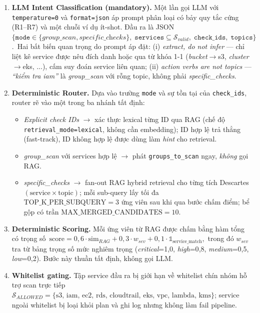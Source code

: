 \begin{enumerate}
  \item \textbf{LLM Intent Classification (mandatory).} Một lần gọi LLM với \texttt{temperature=0} và \texttt{format=json} áp prompt phân loại có bảy quy tắc cứng (R1--R7) và một chuỗi ví dụ ít-shot. Đầu ra là JSON\
    $\{\texttt{mode} \in \{\textit{group\_scan}, \textit{specific\_checks}\},\;
       \texttt{services} \subseteq \mathcal{S}_{valid},\;
       \texttt{check\_ids},\;
       \texttt{topics}\}$.\
    Hai bất biến quan trọng do prompt áp đặt: (i) \textit{extract, do not infer} --- chỉ liệt kê service được nêu đích danh hoặc qua từ khóa 1-1 (\textit{bucket}$\to$s3, \textit{cluster}$\to$eks, ...), cấm suy đoán service liên quan; (ii) \textit{action verbs are not topics} --- \textit{``kiểm tra iam''} là \textit{group\_scan} với rỗng topic, không phải \textit{specific\_checks}.
  \item \textbf{Deterministic Router.} Dựa vào trường \texttt{mode} và sự tồn tại của \texttt{check\_ids}, router rẽ vào một trong ba nhánh tất định:
    \begin{itemize}
      \item \textit{Explicit check IDs} $\to$ xác thực lexical từng ID qua RAG (chế độ \texttt{retrieval\_mode=lexical}, không cần embedding); ID hợp lệ trả thẳng (fast-track), ID không hợp lệ được dùng làm \textit{hint} cho retrieval.
      \item \textit{group\_scan} với services hợp lệ $\to$ phát \texttt{groups\_to\_scan} ngay, \textit{không} gọi RAG.
      \item \textit{specific\_checks} $\to$ fan-out RAG hybrid retrieval cho từng tích Descartes $(\text{service} \times \text{topic})$; mỗi sub-query lấy tối đa $\text{TOP\_K\_PER\_SUBQUERY}=3$ ứng viên sau khi qua bước chấm điểm; bể gộp có trần $\text{MAX\_MERGED\_CANDIDATES}=10$.
    \end{itemize}
  \item \textbf{Deterministic Scoring.} Mỗi ứng viên từ RAG được chấm bằng hàm tổng có trọng số\
    $\text{score} = 0{,}6 \cdot \text{sim}_{RAG} + 0{,}3 \cdot w_{sev} + 0{,}1 \cdot \mathbb{1}_{\text{service\_match}}$,\
    trong đó $w_{sev}$ tra từ bảng trọng số mức nghiêm trọng (\textit{critical}=1{,}0, \textit{high}=0{,}8, \textit{medium}=0{,}5, \textit{low}=0{,}2). Bước này thuần tất định, không gọi LLM.
  \item \textbf{Whitelist gating.} Tập service đầu ra bị giới hạn về whitelist chín nhóm hỗ trợ scan trực tiếp $\mathcal{S}_{ALLOWED} = \{\text{s3, iam, ec2, rds, cloudtrail, eks, vpc, lambda, kms}\}$; service ngoài whitelist bị loại khỏi plan và ghi log nhưng không làm fail pipeline.
\end{enumerate}

